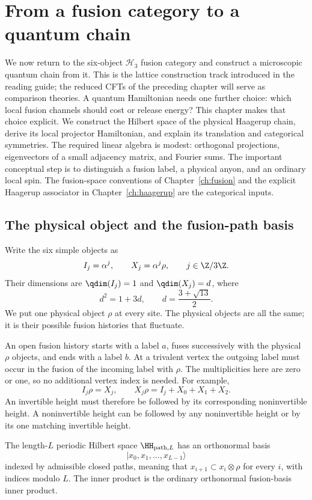 \chapter{From a fusion category to a quantum chain}
\label{ch:chain}

We now return to the six-object $\mathcal H_3$ fusion category and
construct a microscopic quantum chain from it. This is the lattice
construction track introduced in the reading guide; the reduced CFTs
of the preceding chapter will serve as comparison theories.
A quantum Hamiltonian needs one further choice: which
local fusion channels should cost or release energy? This chapter makes that
choice explicit. We construct the Hilbert space of the physical Haagerup
chain, derive its local projector Hamiltonian, and explain its translation
and categorical symmetries. The required linear algebra is modest: orthogonal
projections, eigenvectors of a small adjacency matrix, and Fourier sums. The
important conceptual step is to distinguish a fusion label, a physical anyon,
and an ordinary local spin.
The fusion-space conventions of Chapter~\ref{ch:fusion} and the explicit
Haagerup associator in Chapter~\ref{ch:haagerup} are the categorical inputs.

\section{The physical object and the fusion-path basis}

Write the six simple objects as
\[
 I_j=\alpha^j,\qquad X_j=\alpha^j\rho,\qquad j\in\Z/3\Z.
\]
Their dimensions are $\qdim(I_j)=1$ and $\qdim(X_j)=d$, where
\[
 d^2=1+3d,\qquad d=\frac{3+\sqrt{13}}2.
\]
We put one physical object $\rho$ at every site. The physical objects are all
the same; it is their possible fusion histories that fluctuate.

An open fusion history starts with a label $a$, fuses successively with the
physical $\rho$ objects, and ends with a label $b$. At a trivalent vertex the
outgoing label must occur in the fusion of the incoming label with $\rho$.
The multiplicities here are zero or one, so no additional vertex index is
needed. For example,
\[
 I_j\rho=X_j,\qquad
 X_j\rho=I_j+X_0+X_1+X_2.
\]
An invertible height must therefore be followed by its corresponding
noninvertible height. A noninvertible height can be followed by any
noninvertible height or by its one matching invertible height.

\begin{definition}
The length-$L$ periodic Hilbert space $\HH_{\mathrm{path},L}$ has an orthonormal basis
\[
 |x_0,x_1,\ldots,x_{L-1}\rangle
\]
indexed by admissible closed paths, meaning that
$x_{i+1}\subset x_i\otimes\rho$ for every $i$, with indices modulo $L$.
The inner product is the ordinary orthonormal fusion-basis inner product.
\end{definition}

